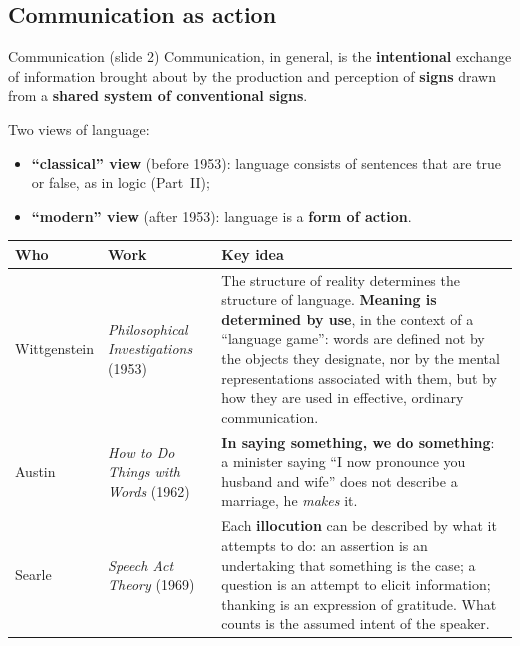 \subsection{Communication as action}
\label{sec:communication-as-action}

\begin{nbdef}{Communication (slide 2)}
Communication, in general, is the \textbf{intentional} exchange of information brought about
by the production and perception of \textbf{signs} drawn from a \textbf{shared system of
conventional signs}.
\end{nbdef}

Two views of language:
\begin{itemize}[nosep]
  \item \textbf{``classical'' view} (before 1953): language consists of sentences that are
        true or false, as in logic (Part~II);
  \item \textbf{``modern'' view} (after 1953): language is a \textbf{form of action}.
\end{itemize}

\begin{center}
\small
\renewcommand{\arraystretch}{1.2}
\begin{tabularx}{\linewidth}{@{}l l X@{}}
\toprule
\textbf{Who} & \textbf{Work} & \textbf{Key idea} \\
\midrule
Wittgenstein & \emph{Philosophical Investigations} (1953) & The structure of reality
  determines the structure of language. \textbf{Meaning is determined by use}, in the
  context of a ``language game'': words are defined not by the objects they designate, nor
  by the mental representations associated with them, but by how they are used in
  effective, ordinary communication. \\
Austin & \emph{How to Do Things with Words} (1962) & \textbf{In saying something, we do
  something}: a minister saying ``I now pronounce you husband and wife'' does not describe a
  marriage, he \emph{makes} it. \\
Searle & \emph{Speech Act Theory} (1969) & Each \textbf{illocution} can be described by what
  it attempts to do: an assertion is an undertaking that something is the case; a question
  is an attempt to elicit information; thanking is an expression of gratitude. What counts
  is the assumed intent of the speaker. \\
\bottomrule
\end{tabularx}
\end{center}

